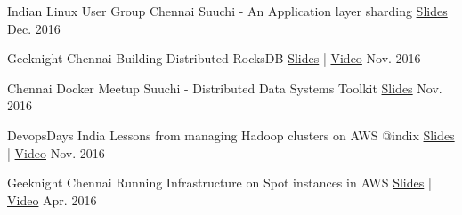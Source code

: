 

\begin{cventries}

  \cventry
    {Indian Linux User Group Chennai} %
    {Suuchi - An Application layer sharding} %
    {\href{https://speakerdeck.com/ashwanthkumar/suuchi-application-layer-sharding}{Slides}} %
    {Dec. 2016} %
    {
    }

  \cventry
    {Geeknight Chennai} %
    {Building Distributed RocksDB} %
    {\href{http://bit.ly/distributed-rocksdb}{Slides} | \href{https://www.youtube.com/watch?v=PSCa9_Avne0}{Video}} %
    {Nov. 2016} %
    {
    }

  \cventry
    {Chennai Docker Meetup} %
    {Suuchi - Distributed Data Systems Toolkit} %
    {\href{http://bit.ly/suuchi-toolkit}{Slides}} %
    {Nov. 2016} %
    {
    }

  \cventry
    {DevopsDays India} %
    {Lessons from managing Hadoop clusters on AWS @indix} %
    {\href{http://bit.ly/autoscaling-on-aws}{Slides} | \href{https://www.youtube.com/watch?v=eBbgylpRufQ}{Video}} %
    {Nov. 2016} %
    {
    }

  \cventry
    {Geeknight Chennai} %
    {Running Infrastructure on Spot instances in AWS} %
    {\href{http://j.mp/to-matsya-geeknight}{Slides} | \href{https://www.youtube.com/watch?v=qeBV9JRoTOA}{Video}} %
    {Apr. 2016} %
    {
    }

\end{cventries}
